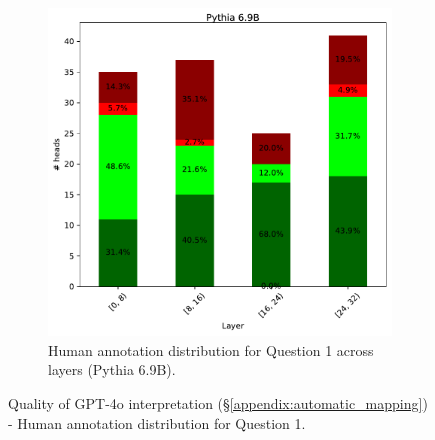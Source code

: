 \documentclass[11pt]{article}
\newcommand{\PythiaSevenB}{Pythia 6.9B}
\newcommand{\GPTFourO}{GPT-4o}
\begin{document}
\begin{figure}[tp]
    \begin{subfigure}{\columnwidth}
        \includegraphics[scale=0.45]
        {figures/human_validation/q1_by_layer_pythia}
        \caption{Human annotation distribution for Question 1 across layers (\PythiaSevenB{}).}
    \end{subfigure}
\caption{Quality of \GPTFourO{} interpretation (\S\ref{appendix:automatic_mapping}) - Human annotation distribution for Question 1.}
\label{fig:human_val_q1}
\end{figure}
\end{document}
